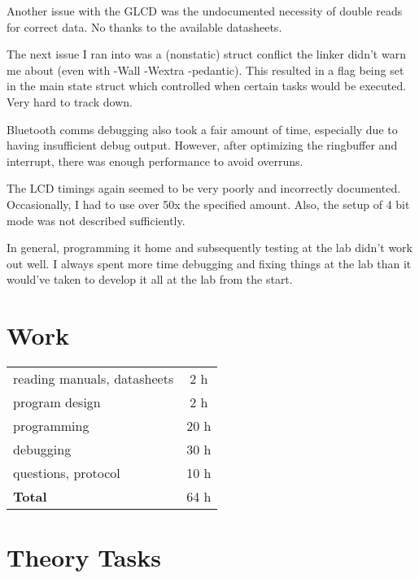 \documentclass[12pt,a4paper,titlepage,oneside]{article}
\begin{document}
Another issue with the GLCD was the undocumented necessity of double reads for
correct data. No thanks to the available datasheets.

The next issue I ran into was a (nonstatic) struct conflict the linker didn't warn
me about (even with -Wall -Wextra -pedantic). This resulted in a flag being set
in the main state struct which controlled when certain tasks would be executed.
Very hard to track down.

Bluetooth comms debugging also took a fair amount of time, especially due to having insufficient debug output. However, after optimizing the ringbuffer and interrupt, there was enough performance to avoid overruns.

The LCD timings again seemed to be very poorly and incorrectly documented. Occasionally, I had to use over 50x the specified amount. Also, the setup of 4 bit mode was not described sufficiently.

In general, programming it home and subsequently testing at the lab didn't work
out well. I always spent more time debugging and fixing things at the lab
than it would've taken to develop it all at the lab from the start.


\section{Work}

\begin{tabular}{|l|c|}
\hline
reading manuals, datasheets	& 2 h	\\
program design			& 2 h	\\
programming			& 20 h	\\
debugging			& 30 h	\\
questions, protocol		& 10 h	\\
\hline
{\bf Total}			& 64 h	\\
\hline
\end{tabular}



\section{Theory Tasks}
\end{document}
